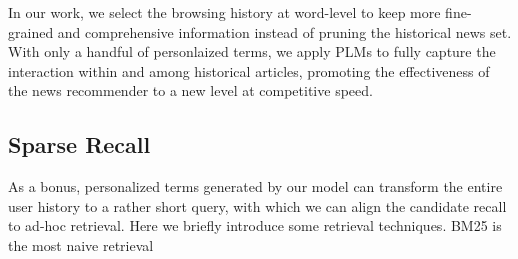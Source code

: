 \documentclass[sigconf,anonymous]{acmart}
\begin{document}
In our work, we select the browsing history at word-level to keep more fine-grained and comprehensive information instead of pruning the historical news set. With only a handful of personlaized terms, we apply PLMs to fully capture the interaction within and among historical articles, promoting the effectiveness of the news recommender to a new level at competitive speed.

\subsection{Sparse Recall}
As a bonus, personalized terms generated by our model can transform the entire user history to a rather short query, with which we can align the candidate recall to ad-hoc retrieval. Here we briefly introduce some retrieval techniques. BM25 is the most naive retrieval
\clearpage



\end{document}
